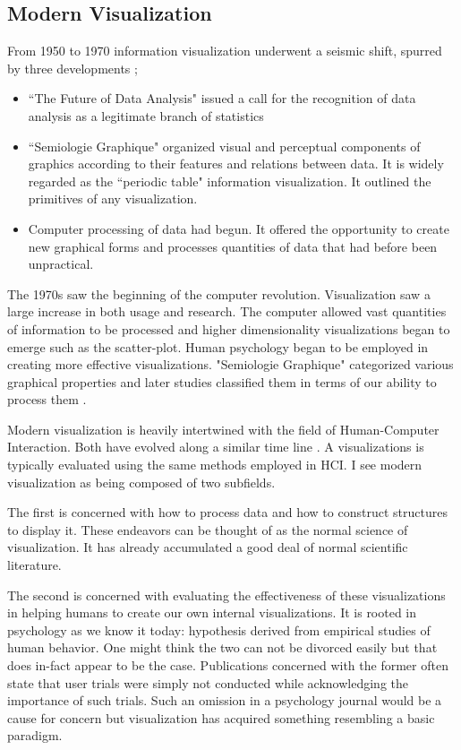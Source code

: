 \documentclass[a4paper, 10pt, titlepage, twocolumn]{article}
\begin{document}
\subsection{Modern Visualization}

From 1950 to 1970 information visualization underwent a seismic shift, spurred by three developments \cite{friendly2001milestones};
\begin{itemize}
\item ``The Future of Data Analysis" issued a call for the recognition of data analysis as a legitimate branch of statistics \cite{tukey1962future}
\item ``Semiologie Graphique" \cite{bertin1973semiologie} organized visual and perceptual components of graphics according to their features and relations between data. It is widely regarded as the ``periodic table" information visualization. It outlined the primitives of any visualization.
\item Computer processing of data had begun. It offered the opportunity to create new graphical forms and processes quantities of data that had before been unpractical.
\end{itemize}

The 1970s saw the beginning of the computer revolution. Visualization saw a large increase in both usage and research. The computer allowed vast quantities of information to be processed and higher dimensionality visualizations began to emerge such as the scatter-plot. Human psychology began to be employed in creating more effective visualizations. "Semiologie Graphique" categorized various graphical properties and later studies classified them in terms of our ability to process them \cite{cleveland1984graphical}.

Modern visualization is heavily intertwined with the field of Human-Computer Interaction. Both have evolved along a similar time line \cite{myers1998brief}. A visualizations is typically evaluated using the same methods employed in HCI. I see modern visualization as being composed of two subfields. 

The first is concerned with how to process data and how to construct structures to display it. These endeavors can be thought of as the normal science of visualization. It has already accumulated a good deal of normal scientific literature.

The second is concerned with evaluating the effectiveness of these visualizations in helping humans to create our own internal visualizations. It is rooted in psychology as we know it today: hypothesis derived from empirical studies of human behavior. One might think the two can not be divorced easily but that does in-fact appear to be the case. Publications concerned with the former often state that user trials were simply not conducted while acknowledging the importance of such trials. Such an omission in a psychology journal would be a cause for concern but visualization has acquired something resembling a basic paradigm.
\end{document}

